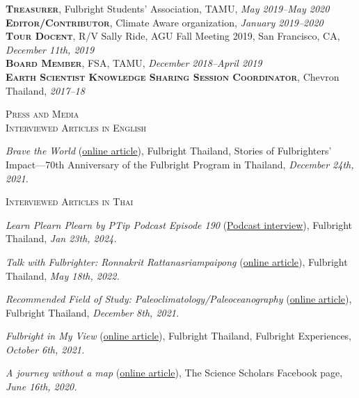\documentclass[10pt, letter]{article}
\newcommand{\margintext}[1]{\marginnote{\normalsize\textbf #1 |}}
\begin{document}
\bigskip
\textsc{\textbf{Treasurer}}, Fulbright Students’ Association, TAMU, \textit{May 2019–May 2020} \\
\textsc{\textbf{Editor/Contributor}}, Climate Aware organization, \textit{January 2019–2020} \\
\textsc{\textbf{Tour Docent}}, R/V Sally Ride, AGU Fall Meeting 2019, San Francisco, CA, \textit{December 11th, 2019}\\
\textsc{\textbf{Board Member}}, FSA, TAMU, \textit{December 2018–April 2019}\\
\textsc{\textbf{Earth Scientist Knowledge Sharing Session Coordinator}}, Chevron Thailand, \textit{2017–18}


\bigskip
\margintext{Outreach}
\textsc{Press and Media}\\
\textsc{Interviewed Articles in English}
\begin{etaremune}
\item \textit{Brave the World} (\href{https://issuu.com/fulbrightthailand/docs/storeis_fo_fulbrighters_impact}{online article}), Fulbright Thailand, Stories of Fulbrighters’ Impact—70th Anniversary of the Fulbright Program in Thailand, \textit{December 24th, 2021.}
\end{etaremune}

\textsc{Interviewed Articles in Thai}
\begin{etaremune}
\item \textit{Learn Plearn Plearn by PTip Podcast Episode 190} (\href{https://open.spotify.com/episode/5iJYhIJBjMwboy3JaC0Rp3?si=7d5a29447a72444b}{Podcast interview}), Fulbright Thailand, \textit{Jan 23th, 2024.}
\item \textit{Talk with Fulbrighter: Ronnakrit Rattanasriampaipong} (\href{https://www.fulbrightthai.org/fulbright-stories/khuykab-fulbrighter-rnkrsdi-ratnsrii-amaiphphngs}{online article}), Fulbright Thailand, \textit{May 18th, 2022.}
\item \textit{Recommended Field of Study: Paleoclimatology/Paleoceanography} (\href{https://www.fulbrightthai.org/knowledge-sharing/saakhaa-yaakaenanam-1-paleoclimatology-paleoceanography}{online article}), Fulbright Thailand, \textit{December 8th, 2021.}
\item \textit{Fulbright in My View} (\href{https://anyflip.com/afeb/buat/?fbclid=IwAR08dv9XF7UCimtM9SjwICdCSwSQfuTHNtPbbaepT4WZlTcNRXB9eNtUsi8}{online article}), Fulbright Thailand, Fulbright Experiences, \textit{October 6th, 2021.}
\item \textit{A journey without a map} (\href{https://www.facebook.com/ThaiScienceScholars/photos/a.114754726700839/170670231109288/?type=3}{online article}), The Science Scholars Facebook page, \textit{June 16th, 2020.}
\end{etaremune}
\end{document}
